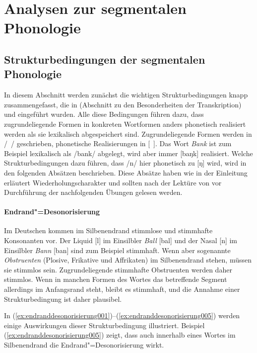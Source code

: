 \section{Analysen zur segmentalen Phonologie}
\label{sec:phonologie:analysenzursegmentalenphonologie}

\subsection{Strukturbedingungen der segmentalen Phonologie}
\label{sec:phonologie:strukturbedingungendersegmentalenphonologie}

In diesem Abschnitt werden zunächst die wichtigen Strukturbedingungen knapp zusammengefasst, die in  (Abschnitt zu den Besonderheiten der Transkription) und  eingeführt wurden.
Alle diese Bedingungen führen dazu, dass zugrundeliegende Formen in konkreten Wortformen anders phonetisch realisiert werden als sie lexikalisch abgespeichert sind.
Zugrundeliegende Formen werden in /~/ geschrieben, phonetische Realisierungen in [~].
Das Wort \textit{Bank} ist zum Beispiel lexikalisch als /bank/ abgelegt, wird aber immer [baŋk] realisiert.
Welche Strukturbedingungen dazu führen, dass /n/ hier phonetisch zu [ŋ] wird, wird in den folgenden Absätzen beschrieben.
Diese Absätze haben wie in der Einleitung erläutert Wiederholungscharakter und sollten nach der Lektüre von  vor Durchführung der nachfolgenden Übungen gelesen werden.

\paragraph*{Endrand"=Desonorisierung}

Im Deutschen kommen im Silbenendrand stimmlose und stimmhafte Konsonanten vor.
Der Liquid [l] im Einsilbler \textit{Ball} [bal] und der Nasal [n] im Einsilbler \textit{Bann} [ban] sind zum Beispiel stimmhaft.
Wenn aber sogenannte \textit{Obstruenten} (Plosive, Frikative und Affrikaten) im Silbenendrand stehen, müssen sie stimmlos sein.
Zugrundeliegende stimmhafte Obstruenten werden daher stimmlos.
Wenn in manchen Formen des Wortes das betreffende Segment allerdings im Anfangsrand steht, bleibt es stimmhaft, und die Annahme einer Strukturbedingung ist daher plausibel.

In (\ref{ex:endranddesonorisierung001})--(\ref{ex:endranddesonorisierung005}) werden einige Auswirkungen dieser Strukturbedingung illustriert.
Beispiel (\ref{ex:endranddesonorisierung005}) zeigt, dass auch innerhalb eines Wortes im Silbenendrand die Endrand"=Desonorisierung wirkt.

